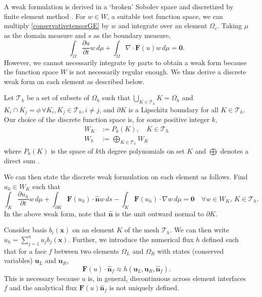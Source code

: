 \documentclass[11pt]{article}
\let\bld\boldsymbol
\begin{document}
A weak formulation is derived in a `broken' Sobolev space and discretized by finite element method \cite{luo_taylor}. For $w \in W$, a suitable test function space, we can multiply \eqref{conservativetensorGE} by $w$ and integrate over an element $\Omega_e$. Taking $\mu$ as the domain measure and $s$ as the boundary measure,
\begin{equation}
\int_{\Omega} \frac{\partial u}{\partial t}w\,d\mu + \int_{\Omega}\nabla\cdot\bld{F}(u)w \,d\mu = \bld{0}.
\end{equation}
However, we cannot necessarily integrate by parts to obtain a weak form because the function space $W$ is not necessarily regular enough. We thus derive a discrete weak form on each element as described below.

Let $\mathcal{T}_h$ be a set of subsets of $\Omega_h$ such that $\bigcup_{K\in \mathcal{T}_h}K = \Omega_h$ and $K_i \cap K_j = \phi \, \forall K_i, K_j \in \mathcal{T}_h, i \neq j$, and $\partial K$ is a Lipschitz boundary for all $K \in \mathcal{T}_h$. Our choice of the discrete function space is, for some positive integer $k$,
\begin{align}
W_{K} &:= P_k(K), \quad K \in \mathcal{T}_h \\
W_h &:= \bigoplus_{K \in \mathcal{T}_h} W_{K}
\end{align}
where $P_k(K)$ is the space of $k$th degree polynomials on set $K$ and $\bigoplus$ denotes a direct sum \cite{nodaldg}.

We can then state the discrete weak formulation on each element as follows. Find $u_h \in W_{K}$ such that
\begin{equation}
\int_{K} \frac{\partial u_h}{\partial t}w\,d\mu + \int_{\partial K} \bld{F}(u_h)\cdot\hat{\bld{n}}w \,ds - \int_{K}\bld{F}(u_h)\cdot\nabla w \,d\mu = \bld{0} \quad \forall w \in W_{K},\, K \in \mathcal{T}_h.
\label{wf}
\end{equation}
In the above weak form, note that $\hat{\bld{n}}$ is the unit outward normal to $\partial K$.

Consider basis $b_i(\bld{x})$ on an element $K$ of the mesh $\mathcal{T}_h$. We can then write $u_h = \sum_{j=1}^n u_j b_j(\bld{x})$. Further, we introduce the numerical flux $h$ defined such that for a face $f$ between two elements $\Omega_L$ and $\Omega_R$ with states (conserved variables) $\bld{u}_L$ and $ \bld{u}_R$,
\begin{equation}
\bld{F}(u)\cdot\hat{\bld{n}}_f \approx h(\bld{u}_L, \bld{u}_R, \hat{\bld{n}}_f).
\end{equation}
This is necessary because $u$ is, in general, discontinuous across element interfaces $f$ and the analytical flux $\bld{F}(u)\hat{\bld{n}}_f$ is not uniquely defined.
\end{document}
